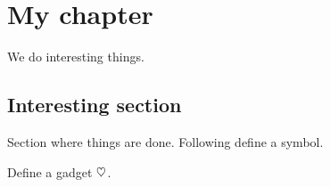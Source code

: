 %
%

\chapter{My chapter} %
We do interesting things.

\section{Interesting section} %
\label{sec:interesting_section}
Section where things are done. Following \cite{abbreviation} define a symbol.
\begin{definition}\label{def:mathSymb}
    Define a gadget $\heartsuit$.
\end{definition}

